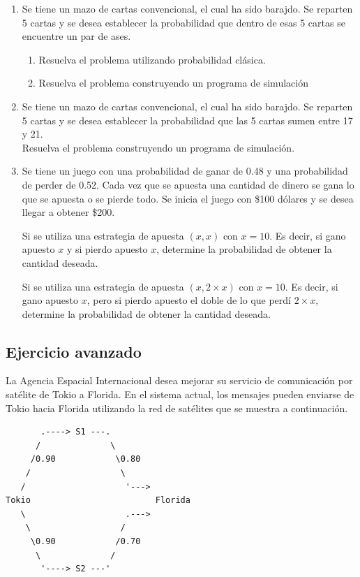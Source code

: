 \begin{enumerate}
\begin{enumerate}[label=\alph*.]
      \end{enumerate}
Sugerencia: La probabilidad es: 0.50


    \item Se tiene un mazo de cartas convencional, el cual ha sido barajdo. Se reparten 5 cartas y se desea establecer la probabilidad que dentro de esas 5 cartas se encuentre un par de ases.
        \begin{enumerate}[label=\alph*.]
        \item Resuelva el problema utilizando probabilidad clásica. 
        \item Resuelva el problema construyendo un programa de simulación
      \end{enumerate}

    \item Se tiene un mazo de cartas convencional, el cual ha sido barajdo. Se reparten 5 cartas y se desea establecer la probabilidad que las 5 cartas sumen entre 17 y 21.\\
Resuelva el problema construyendo un programa de simulación.
    \item Se tiene un juego con una probabilidad de ganar de 0.48 y una probabilidad de perder de 0.52. Cada vez que se apuesta una cantidad de dinero se gana lo que se apuesta o se pierde todo. Se inicia el juego con \$100 dólares y se desea llegar a obtener \$200.

\subitem Si se utiliza una estrategia de apuesta $(x,x)$ con $x=10$. Es decir, si gano apuesto $x$ y si pierdo apuesto $x$, determine la probabilidad de obtener la cantidad deseada.

\subitem Si se utiliza una estrategia de apuesta $(x,2\times x)$ con $x=10$. Es decir, si gano apuesto $x$, pero si pierdo apuesto el doble de lo que perdí $2\times x$, determine la probabilidad de obtener la cantidad deseada.

\end{enumerate}



\subsection{Ejercicio avanzado}

La Agencia Espacial Internacional desea mejorar su servicio de comunicación por satélite de Tokio a Florida. En el sistema actual, los mensajes pueden enviarse de Tokio hacia Florida utilizando la red de satélites que se muestra a continuación.

\begin{verbatim}
       .----> S1 ---.
      /              \
     /0.90            \0.80
    /                  \
   /                    '--->
Tokio                         Florida
   \                    .--->
    \                  /
     \0.90            /0.70
      \              /
       '----> S2 ---'
\end{verbatim}


